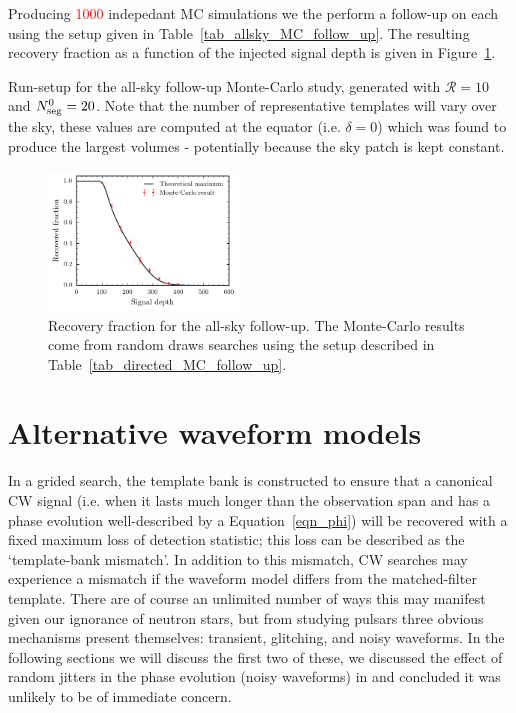 \documentclass[aps, prd, twocolumn, superscriptaddress, floatfix, showpacs, nofootinbib, longbibliography]{revtex4-1}
\newcommand{\CHECK}[1]{\textcolor{red}{#1}}
\begin{document}
Producing \CHECK{1000} indepedant MC simulations we the perform a follow-up on
each using the setup given in Table~\ref{tab_allsky_MC_follow_up}. The
resulting recovery fraction as a function of the injected signal depth is given
in Figure~\ref{fig_allsky_MC_follow_up}.

\begin{table}[htb]
\caption{Run-setup for the all-sky follow-up Monte-Carlo study, generated with
$\mathcal{R}=10$ and $N_{\rm seg}^0=20$. Note that the number of representative
templates will vary over the sky, these values are computed at the equator
(i.e. $\delta=0$) which was found to produce the largest volumes - potentially
because the sky patch is kept constant.}
\label{tab_allsky_MC_follow_up}

\end{table}

\begin{figure}[htb]
\centering
\includegraphics[width=0.45\textwidth]{allsky_recovery}
\caption{Recovery fraction for the all-sky follow-up. The Monte-Carlo results
come from random draws searches using the setup described in
Table~\ref{tab_directed_MC_follow_up}.}
\label{fig_allsky_MC_follow_up}
\end{figure}

\section{Alternative waveform models}

In a grided search, the template bank is constructed to ensure that a canonical
CW signal (i.e. when it lasts much longer than the observation span and has a
phase evolution well-described by a Equation~\eqref{eqn_phi}) will be
recovered with a fixed maximum loss of detection statistic; this loss can be
described as the `template-bank mismatch'. In addition to this mismatch, CW
searches may experience a mismatch if the waveform model differs from the
matched-filter template. There are of course an unlimited number of ways this
may manifest given our ignorance of neutron stars, but from studying pulsars
three obvious mechanisms present themselves: transient, glitching, and noisy
waveforms. In the following sections we will discuss the first two of these, we
discussed the effect of random jitters in the phase evolution (noisy waveforms)
in \citet{ashton2015} and concluded it was unlikely to be of immediate concern.
\end{document}
